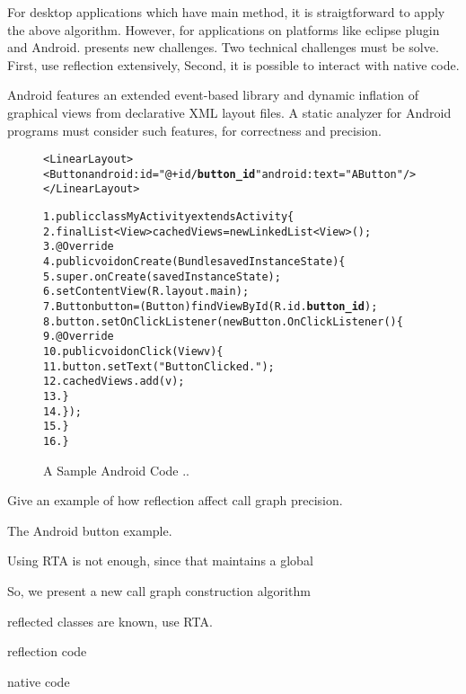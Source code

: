 For desktop applications which have main method, it is straigtforward to apply
the above algorithm. However, for applications on platforms like eclipse plugin
and Android. presents new challenges. Two technical challenges must be solve.
First, use reflection extensively, Second, it is possible to interact with
native code.

Android features an extended event-based library and dynamic inflation of
graphical views from declarative XML layout files.
A static analyzer for Android programs must consider such features, for
correctness and precision.

\begin{figure}[t]
\begin{CodeOut}
\begin{alltt}

<LinearLayout>
    <Button android:id="@+id/\textbf{button\_id}" android:text="A Button" />
</LinearLayout>

1. public class MyActivity extends Activity \{
2.    final List<View> cachedViews = new LinkedList<View>();
3.    @Override
4.    public void onCreate(Bundle savedInstanceState) \{
5.        super.onCreate(savedInstanceState);
6.        setContentView(R.layout.main);
7.        Button button = (Button) findViewById(R.id.\textbf{button\_id});
8.        button.setOnClickListener(new Button.OnClickListener() \{
9.            @Override
10.           public void onClick(View v) \{
11.               button.setText("Button Clicked.");
12.               cachedViews.add(v);
13.           \}
14.       \});
15.   \}
16. \}
\end{alltt}
\end{CodeOut}
\label{fig:sampleandroid}
\caption{A Sample Android Code ..}
\end{figure}


Give an example of how reflection affect call graph precision.

The Android button example.

Using RTA is not enough, since that maintains a global

So, we present a new call graph construction algorithm

reflected classes are known, use RTA.

reflection code

native code

